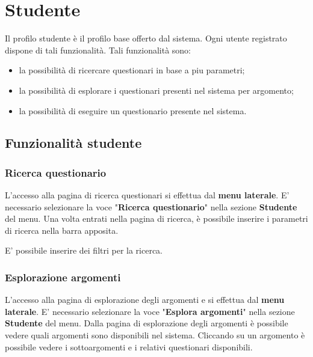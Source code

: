 \documentclass[12pt,a4paper]{article}
\begin{document}
	\newpage

	\section{Studente}\label{studente}
	Il profilo studente è il profilo  base offerto dal sistema. Ogni utente registrato dispone di tali funzionalità. Tali funzionalità sono:
	\begin{itemize}
		\item la possibilità di ricercare questionari in base a piu parametri;
		\item la possibilità di esplorare i questionari presenti nel sistema per argomento;
		\item la possibilità di eseguire un questionario presente nel sistema.
	\end{itemize}
	
	\subsection{Funzionalità studente}
	\subsubsection{Ricerca questionario}\label{ricerca_questionario}
	L'accesso alla pagina di ricerca questionari si effettua dal \textbf{menu laterale}. 
	E' necessario selezionare la voce "\textbf{Ricerca questionario}" nella sezione \textbf{Studente} del menu.
	Una volta entrati nella pagina di ricerca, è possibile inserire i parametri di ricerca nella barra apposita.

	
	E' possibile inserire dei filtri per la ricerca. 

	
	\subsubsection{Esplorazione argomenti}	
	
	 \label{esplorazione_arg}
	L'accesso alla pagina di esplorazione degli argomenti e si effettua dal \textbf{menu laterale}. 
	E' necessario selezionare la voce "\textbf{Esplora argomenti}" nella sezione \textbf{Studente} del menu.
	Dalla pagina di esplorazione degli argomenti è possibile vedere quali argomenti sono disponibili nel sistema. Cliccando su un argomento è possibile vedere i sottoargomenti e i relativi questionari disponibili.
	
\end{document}
